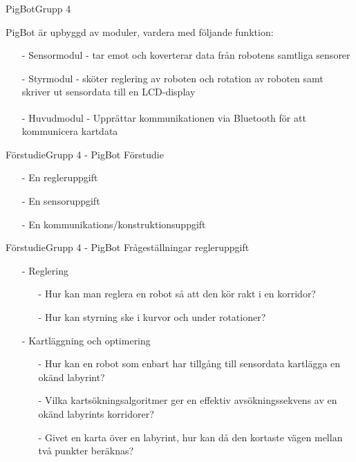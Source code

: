 \begin{frame}[fragile]{PigBot}{Grupp 4}

PigBot är upbyggd av moduler, vardera med följande funktion:
  \begin{itemize}
\pause
    \item[-] Sensormodul - tar emot och koverterar data från robotens samtliga sensorer
\pause
    \item[-] Styrmodul - sköter reglering av roboten och rotation av roboten samt skriver ut sensordata till en LCD-display
\pause
    \item[-] Huvudmodul - Upprättar kommunikationen via Bluetooth\textsuperscript{\circledR} för att kommunicera kartdata
  \end{itemize}
\end{frame}


\begin{frame}{Förstudie}{Grupp 4 - PigBot}
Förstudie
\pause
  \begin{itemize}
    \item[-] En regleruppgift
    \item[-] En sensoruppgift 
    \item[-] En kommunikations/konstruktionsuppgift
  \end{itemize}
\end{frame}


\begin{frame}{Förstudie}{Grupp 4 - PigBot}
Frågeställningar regleruppgift
  \begin{itemize}
\pause
    \item[-] Reglering
\pause
\begin{itemize}
	\item [-] Hur kan man reglera en robot så att den kör rakt i en korridor?
	\item [-] Hur kan styrning ske i kurvor och under rotationer?
\end{itemize}
\pause
    \item[-] Kartläggning och optimering 
\begin{itemize}
	\item [-] Hur kan en robot som enbart har tillgång till sensordata kartlägga en okänd labyrint?
	\item [-] Vilka kartsökningsalgoritmer ger en effektiv avsökningssekvens av en okänd labyrints korridorer?
	\item [-] Givet en karta över en labyrint, hur kan då den kortaste vägen mellan två punkter beräknas?
\end{itemize}
  \end{itemize}
\end{frame}


